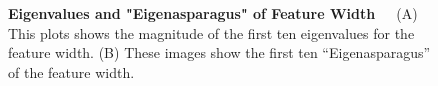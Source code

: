 \begin{figure}
    \centering
    \qquad
    \caption[First ten Eigenvalues and "Eigenasparagus" of Feature Width]{\textbf{Eigenvalues and "Eigenasparagus" of Feature Width}~~~(A) This plots shows the magnitude of the first ten eigenvalues for the feature width. (B) These images show the first ten “Eigenasparagus” of the feature width.}
    \label{fig:PCAwidth}
\end{figure}

